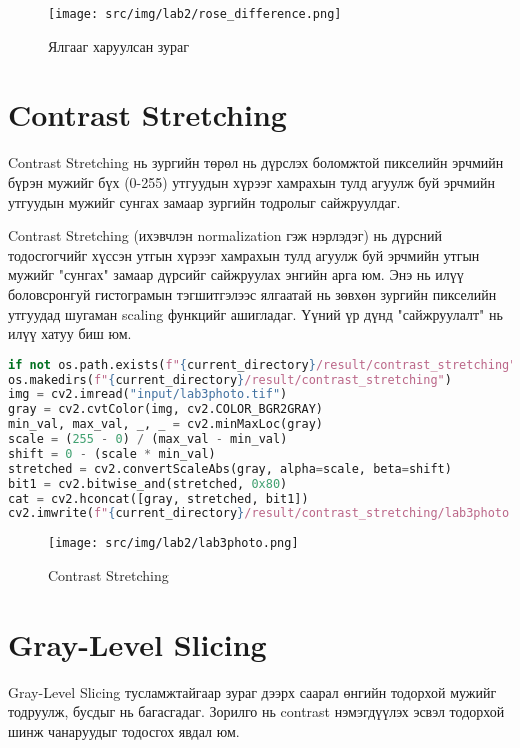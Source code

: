 \begin{figure}
	\centering
	\texttt{[image: src/img/lab2/rose\_difference.png]}
	\caption{Ялгааг харуулсан зураг}
\end{figure}

\pagebreak
\section{Contrast Stretching}

Contrast Stretching нь зургийн төрөл нь дүрслэх боломжтой пикселийн эрчмийн бүрэн мужийг бүх (0-255) утгуудын хүрээг хамрахын тулд агуулж буй эрчмийн утгуудын мужийг сунгах замаар зургийн тодролыг сайжруулдаг. 

Contrast Stretching (ихэвчлэн normalization гэж нэрлэдэг) нь дүрсний тодосгогчийг хүссэн утгын хүрээг хамрахын тулд агуулж буй эрчмийн утгын мужийг "сунгах" замаар дүрсийг сайжруулах энгийн арга юм. Энэ нь илүү боловсронгуй гистограмын тэгшитгэлээс ялгаатай нь зөвхөн зургийн пикселийн утгуудад шугаман scaling функцийг ашигладаг. Үүний үр дүнд "сайжруулалт" нь илүү хатуу биш юм.\cite{contrast}

\begin{lstlisting}[language=Python, caption=Contrast Stretching, frame=single]
if not os.path.exists(f"{current_directory}/result/contrast_stretching"):
os.makedirs(f"{current_directory}/result/contrast_stretching")
img = cv2.imread("input/lab3photo.tif")
gray = cv2.cvtColor(img, cv2.COLOR_BGR2GRAY)
min_val, max_val, _, _ = cv2.minMaxLoc(gray)
scale = (255 - 0) / (max_val - min_val)
shift = 0 - (scale * min_val)
stretched = cv2.convertScaleAbs(gray, alpha=scale, beta=shift)
bit1 = cv2.bitwise_and(stretched, 0x80)
cat = cv2.hconcat([gray, stretched, bit1])
cv2.imwrite(f"{current_directory}/result/contrast_stretching/lab3photo.tif", cat)
\end{lstlisting}

\begin{figure}[h!]
	\centering
	\texttt{[image: src/img/lab2/lab3photo.png]}
	\caption{Contrast Stretching}
\end{figure}

\pagebreak
\section{Gray-Level Slicing}

Gray-Level Slicing тусламжтайгаар зураг дээрх саарал өнгийн тодорхой мужийг тодруулж, бусдыг нь багасгадаг. Зорилго нь contrast нэмэгдүүлэх эсвэл тодорхой шинж чанаруудыг тодосгох явдал юм.

